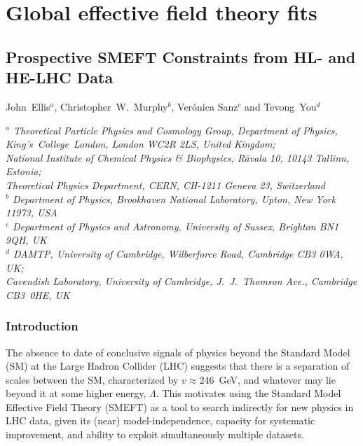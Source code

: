 \documentclass[../report.tex]{subfiles}
\begin{document}
\section{Global effective field theory fits \label{sec8:globalfit}}
\label{sec8}

\subsection{Prospective SMEFT Constraints from HL- and HE-LHC Data %
}
\begin{center}
\bigskip\vspace{1cm}
John~Ellis$^{a}$,
Christopher~W.~Murphy$^b$,%
Ver\'onica Sanz$^{c}$ and
Tevong~You$^{d}$
\begin{center}
{\em $^a$ Theoretical Particle Physics and Cosmology Group, Department of
  Physics, King's~College~London, London WC2R 2LS, United Kingdom;\\
National Institute of Chemical Physics \& Biophysics, R{\" a}vala 10, 10143 Tallinn, Estonia; \\
Theoretical Physics Department, CERN, CH-1211 Geneva 23,
  Switzerland}\\[0.2cm]
{\em $^b$ Department of Physics, Brookhaven National Laboratory, Upton, New York 11973, USA}\\[0.2cm]  
{\em $^c$ Department of Physics and Astronomy, University of Sussex, Brighton BN1 9QH, UK}\\[0.2cm]
{\em $^d$ DAMTP, University of Cambridge, Wilberforce Road, Cambridge CB3 0WA, UK;\\
Cavendish Laboratory, University of Cambridge, J.~J.~Thomson Ave., Cambridge CB3~0HE,
 UK}
\end{center}
\end{center}

\subsubsection{Introduction}
\label{sec8:intro}
The absence to date of conclusive signals of physics beyond the Standard Model (SM) at the Large Hadron Collider (LHC) suggests
that there is a separation of scales between the SM, characterized by $v \approx 246$~GeV, and whatever may lie beyond it at some higher energy, $\Lambda$.
This motivates using the Standard Model Effective Field Theory (SMEFT) as a tool to search indirectly for new physics in LHC data,
given its (near) model-independence, capacity for systematic improvement, and ability to exploit simultaneously multiple datasets.
\end{document}
